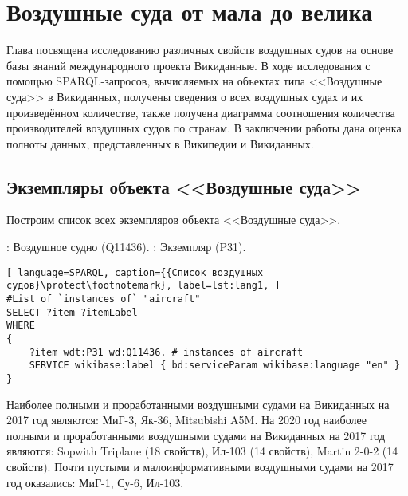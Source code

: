 \chapter{Воздушные суда от мала до велика}%
\label{ch:aircraft-chapter}

Глава посвящена исследованию различных свойств воздушных судов 
на основе базы знаний международного проекта Викиданные. 
В ходе исследования с помощью SPARQL-запросов, вычисляемых на объектах типа <<Воздушные суда>> в Викиданных, 
получены сведения о всех воздушных судах и их произведённом количестве, 
также получена диаграмма соотношения количества производителей воздушных судов по странам. 
В заключении работы дана оценка полноты данных, представленных в Википедии и Викиданных.

\section{Экземпляры объекта <<Воздушные суда>>}

Построим список всех экземпляров объекта <<Воздушные суда>>.

\begin{itemize}
: Воздушное судно (Q11436).
: Экземпляр (P31).
\end{itemize}

\begin{lstlisting}[ language=SPARQL, caption={{Список воздушных судов}\protect\footnotemark}, label=lst:lang1, ]
#List of `instances of` "aircraft"
SELECT ?item ?itemLabel
WHERE
{
    ?item wdt:P31 wd:Q11436. # instances of aircraft
    SERVICE wikibase:label { bd:serviceParam wikibase:language "en" }
}
\end{lstlisting}


Наиболее полными и проработанными воздушными судами на Викиданных на 2017 год являются: МиГ-3, Як-36, Mitsubishi A5M. На 2020 год наиболее полными и проработанными воздушными судами на Викиданных на 2017 год являются: Sopwith Triplane (18 свойств), Ил-103 (14 свойств), Martin 2-0-2 (14 свойств).
Почти пустыми и малоинформативными воздушными судами на 2017 год оказались: МиГ-1, Су-6, Ил-103.

